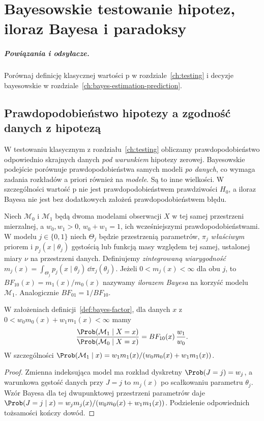 \chapter{Bayesowskie testowanie hipotez, iloraz Bayesa i paradoksy}
\label{ch:bayes-model-testing}
\paragraph{Powiązania i odsyłacze.} Porównaj definicję klasycznej wartości p w rozdziale~\ref{ch:testing} i decyzje bayesowskie w rozdziale~\ref{ch:bayes-estimation-prediction}.


\section{Prawdopodobieństwo hipotezy a zgodność danych z hipotezą}
W testowaniu klasycznym z rozdziału~\ref{ch:testing}
obliczamy prawdopodobieństwo odpowiednio skrajnych danych
\emph{pod warunkiem} hipotezy zerowej. Bayesowskie podejście
porównuje prawdopodobieństwa samych modeli \emph{po danych},
co wymaga zadania rozkładów a priori również na \emph{modele}.
Są to inne wielkości. W szczególności wartość p nie jest
prawdopodobieństwem prawdziwości $H_0$, a iloraz Bayesa nie
jest bez dodatkowych założeń prawdopodobieństwem błędu.

\begin{definicja}
\label{def:bayes-factor}
Niech $\mathcal M_0$ i $\mathcal M_1$ będą dwoma modelami
obserwacji $X$ w tej samej przestrzeni mierzalnej, a
$w_0,w_1>0$, $w_0+w_1=1$, ich wcześniejszymi
prawdopodobieństwami. W modelu $j\in\{0,1\}$
niech $\Theta_j$ będzie przestrzenią parametrów,
$\pi_j$ \emph{właściwym} priorem i
$p_j(x\mid\theta_j)$ gęstością lub funkcją masy
względem tej samej, ustalonej miary $\nu$ na przestrzeni
danych. Definiujemy \emph{zintegrowaną wiarygodność}
$m_j(x)=\int_{\Theta_j}p_j(x\mid\theta_j)\,\dd\pi_j(\theta_j)$.
Jeżeli $0<m_j(x)<\infty$ dla obu $j$, to
$BF_{10}(x)=m_1(x)/m_0(x)$ nazywamy \emph{ilorazem
Bayesa} na korzyść modelu $\mathcal M_1$. Analogicznie
$BF_{01}=1/BF_{10}$.
\end{definicja}

\begin{twierdzenie}[Posterior odds = prior odds razy Bayes factor]
\label{thm:bayes-odds}
W założeniach definicji~\ref{def:bayes-factor}, dla danych
$x$ z $0<w_0m_0(x)+w_1m_1(x)<\infty$ mamy
\[
\frac{\Prob(\mathcal M_1\mid X=x)}
     {\Prob(\mathcal M_0\mid X=x)}
=BF_{10}(x)\,\frac{w_1}{w_0}.
\]
W szczególności $\Prob(\mathcal M_1\mid x)
=w_1m_1(x)/(w_0m_0(x)+w_1m_1(x))$.
\end{twierdzenie}
\begin{proof}
Zmienna indeksująca model ma rozkład dyskretny
$\Prob(J=j)=w_j$, a warunkowa gęstość danych przy $J=j$
to $m_j(x)$ po scałkowaniu parametru $\theta_j$.
Wzór Bayesa dla tej dwupunktowej przestrzeni
parametrów daje $\Prob(J=j\mid x)=w_jm_j(x)/
(w_0m_0(x)+w_1m_1(x))$. Podzielenie odpowiednich
tożsamości kończy dowód.
\end{proof}

